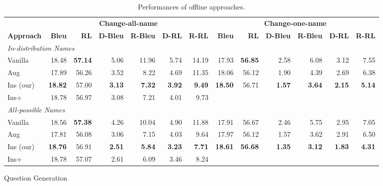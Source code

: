 \begin{table}[th!]
	\begin{subtable}{\linewidth}
		\scriptsize
		\centering
		\begin{tabular}{p{1.2cm}|rrrrrr|rrrrrr}
			\toprule[1pt]
			& \multicolumn{6}{c|}{\textbf{Change-all-name}} & \multicolumn{6}{c}{\textbf{Change-one-name}} \\
			\textbf{Approach} & \textbf{Bleu} & \textbf{RL} & \textbf{D-Bleu} & \textbf{R-Bleu} & \textbf{D-RL} & \textbf{R-RL} & \textbf{Bleu} & \textbf{RL} & \textbf{D-Bleu} & \textbf{R-Bleu} & \textbf{D-RL} & \textbf{R-RL} \\
			
			\hline
			\multicolumn{13}{l}{\textit{In-distribution Names}}\\
			Vanilla & 18.48 & \textbf{57.14} & 5.06 & 11.96 & 5.74&14.19&
			17.93& \textbf{56.85} & 2.58& 6.08& 3.12&7.55 \\
			Aug & 17.89 & 56.26 & 3.52 & 8.22 & 4.69 & 11.35 &
			18.06 & 56.12 & 1.90 & 4.39 & 2.69 & 6.38 \\
			Ins (our)& \textbf{18.82}& 57.00 & \textbf{3.13} & \textbf{7.32} & \textbf{3.92} & \textbf{9.49} &
			\textbf{18.50} & 56.71 & \textbf{1.57}& \textbf{3.64} & \textbf{2.15} & \textbf{5.14} \\
			Ins+ & 18.78 & 56.97 & 3.08 & 7.21 & 4.01 & 9.73 &\\
			
			\hline
			\multicolumn{13}{l}{\textit{All-possible Names}}\\
			Vanilla & 18.56 & \textbf{57.38} & 4.26 & 10.04 & 4.90 & 11.88&
			17.91& 56.67 & 2.46& 5.75 & 2.95 &7.05 \\
			Aug & 17.81 & 56.08 & 3.06 & 7.15 & 4.03 & 9.64 &
			17.97 & 56.12 & 1.57 & 3.62 & 2.91 & 6.50 \\
			Ins (our) & \textbf{18.76} & 56.91 & \textbf{2.51} & \textbf{5.84} & \textbf{3.23} & \textbf{7.71} & 
			\textbf{18.61} & \textbf{56.68} & \textbf{1.35} & \textbf{3.12} & \textbf{1.83} & \textbf{4.31} \\
			Ins+ & 18.78 & 57.07 & 2.61 & 6.09 & 3.46 & 8.24 &\\
			\bottomrule[1pt]
		\end{tabular}
		\caption{Question Generation}
		\label{tab:mdresults-qg}
	\end{subtable}
	\caption{Performances of offline approaches.}	
	\label{tab:mdresults}
\end{table}


